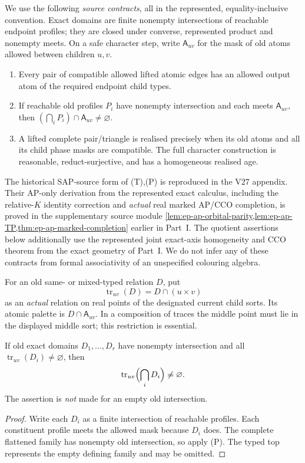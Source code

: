 We use the following \emph{source contracts}, all in the represented,
equality-inclusive convention. Exact domains are finite nonempty
intersections of reachable endpoint profiles; they are closed under
converse, represented product and nonempty meets. On a safe character
step, write \(\mathsf A_{uv}\) for the mask of old atoms allowed
between children \(u,v\).
\begin{enumerate}[label=(\textup{\alph*}),leftmargin=*]
\item[(T)] Every pair of compatible allowed lifted atomic edges has
an allowed output atom of the required endpoint child types.
\item[(P)] If reachable old profiles \(P_i\) have nonempty
intersection and each meets \(\mathsf A_{uv}\), then
\((\bigcap_iP_i)\cap\mathsf A_{uv}\ne\varnothing\).
\item[(R)] A lifted complete pair/triangle is realised precisely
when its old atoms and all its child phase masks are compatible.
The full character construction is reasonable, reduct-surjective,
and has a homogeneous realised age.
\end{enumerate}
The historical SAP-source form of (T),(P) is reproduced
in the V27 appendix. Their AP-only derivation from the
represented exact calculus, including the relative-\(K\)
identity correction and \emph{actual} real marked AP/CCO
completion, is proved in the supplementary source module
\cref{lem:ep-ap-orbital-parity,lem:ep-ap-TP,thm:ep-ap-marked-completion}
earlier in Part~I. The quotient assertions below
additionally use the represented
joint exact-axis homogeneity and CCO theorem from the exact
geometry of Part~I.  We do not infer any of these contracts from
formal associativity of an unspecified colouring algebra.

For an old same- or mixed-typed relation \(D\), put
\[
   \operatorname{tr}_{uv}(D)
   =D\cap(u\times v)
\]
as an \emph{actual} relation on real points of the designated
current child sorts.  Its atomic palette is \(D\cap\mathsf A_{uv}\).
In a composition of traces the middle point must lie in the
displayed middle sort; this restriction is essential.

\begin{lemma}
\label{lem:ep-exact-meet-prime}
If old exact domains \(D_1,\ldots,D_r\) have nonempty intersection
and all \(\operatorname{tr}_{uv}(D_i)\ne\varnothing\), then
\[
    \operatorname{tr}_{uv}\Bigl(\bigcap_iD_i\Bigr)
            \ne\varnothing .
\]
The assertion is \emph{not} made for an empty old intersection.
\end{lemma}
\begin{proof}
Write each \(D_i\) as a finite intersection of reachable profiles.
Each constituent profile meets the allowed mask because \(D_i\)
does. The complete flattened family has nonempty old intersection,
so apply (P). The typed top represents the empty defining family
and may be omitted.
\end{proof}

